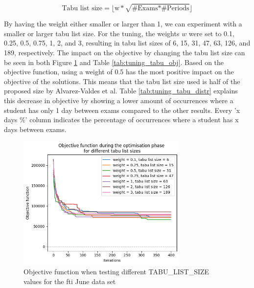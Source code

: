 \begin{equation}
    \text{Tabu list size} = \lfloor\text{w} * \sqrt{\text{\# Exams} * \text{\# Periods}}\rfloor
\end{equation}

By having the weight either smaller or larger than 1, we can experiment with a smaller or larger tabu list size. For the tuning, the weights $w$ were set to 0.1, 0.25, 0.5, 0.75, 1, 2, and 3, resulting in tabu list sizes of 6, 15, 31, 47, 63, 126, and 189, respectively. The impact on the objective by changing the tabu list size can be seen in both Figure \ref{fig:tuning_tabu} and Table \ref{tab:tuning_tabu_obj}. Based on the objective function, using a weight of 0.5  has the most positive impact on the objective of the solutions. This means that the tabu list size used is half of the proposed size by Alvarez-Valdes et al. Table \ref{tab:tuning_tabu_distr} explains this decrease in objective by showing a lower amount of occurrences where a student has only 1 day between exams compared to the other results. Every 'x days \%' column indicates the percentage of occurrences where a student has x days between exams. 

\begin{figure}[H]
	\centering
	\includegraphics[width=0.75\textwidth]{images/tuning/tabu_list.png} 
	\caption{Objective function when testing different TABU\_LIST\_SIZE \\ values for the \acrshort{fti} June data set}
	\label{fig:tuning_tabu}
\end{figure}

